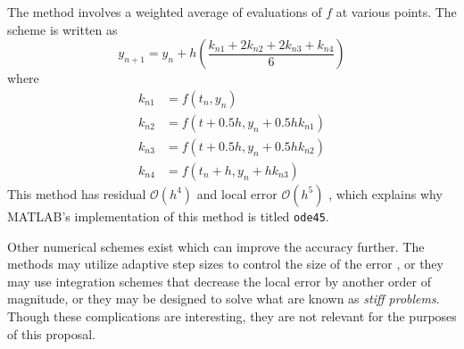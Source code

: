 The method involves a weighted average of evaluations of $ f $ at various points.  The scheme is written as 
%
\begin{equation}\label{RK}
	y_{n+1} = y_n + h \left( \dfrac{k_{n1} + 2k_{n2} + 2k_{n3} + k_{n4}}{6}\right)
\end{equation}
%
where
\begin{align*}
	k_{n1} &= f(t_n, y_n) \\
	k_{n2} &= f(t+0.5h, y_n + 0.5hk_{n1}) \\
	k_{n3} &= f(t + 0.5h, y_n + 0.5hk_{n2})\\
	k_{n4} &= f(t_n + h, y_n + hk_{n3})
\end{align*}
%
This method has residual $ \mathcal{O}(h^4) $ and local error $ \mathcal{O}(h^5) $ \cite{boyce2012differential}, which explains why MATLAB's implementation of this method is titled \verb|ode45|. 

Other numerical schemes exist which can improve the accuracy further.  The methods may utilize adaptive step sizes to control the size of the error \cite{corless2013graduate}, or they may use integration schemes that decrease the local error by another order of magnitude, or they may be designed to solve what are known as \textit{stiff problems}.  Though these complications are interesting, they are not relevant for the purposes of this proposal.